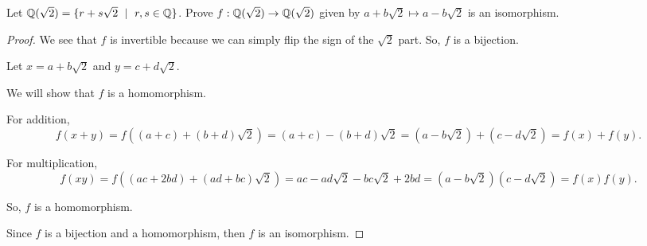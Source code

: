 \documentclass[../hw4]{subfiles}
\begin{document}
\begin{problem}
Let $\Q(\sqrt{2})= \{r + s\sqrt{2}\ \mid\ r,s \in \Q  \} $.
Prove $f:\mathbb{Q}(\sqrt{2 } ) \to \mathbb{Q}(\sqrt{2 } )$ given by $a + b\sqrt{2 } \mapsto a-b\sqrt{2} $ is an isomorphism.
\end{problem}
\begin{proof}
	We see that $f$ is invertible because we can simply flip the sign of the  $\sqrt{2} $ part.
	So, $f$ is a bijection.

	Let  $x=a + b\sqrt{2 } $ and $y=c+d\sqrt{2} $.

	We will show that $f$ is a homomorphism.

	For addition, \[
		f(x + y)
		= f((a + c) + (b + d)\sqrt{2} )
		= (a + c)-(b + d)\sqrt{2}
		= (a-b\sqrt{2})+(c-d\sqrt{2} )
		=f(x)+f(y)
		.\]

	For multiplication, \[
		f(xy)
		= f((ac+2bd)+(ad+bc)\sqrt{2} )
		= ac - ad\sqrt{2}-bc\sqrt{2}+2bd
		= (a-b\sqrt{2} )(c-d\sqrt{2} )
		=f(x)f(y)
		.\]

	So, $f$ is a homomorphism.

	Since  $f$ is a bijection and a homomorphism, then $f$ is an isomorphism.
\end{proof}
\end{document}

